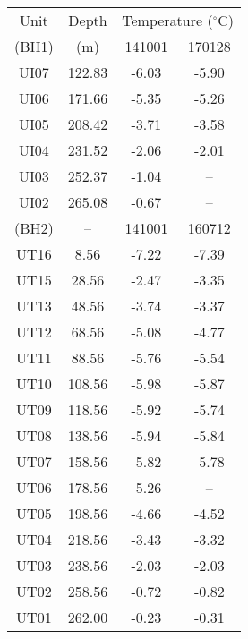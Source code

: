\documentclass[utf8]{article}
\begin{document}
\begin{table}
{\begin{minipage}{85mm}
        \begin{tabular}{cccc}
          \hline
          Unit &  Depth & \multicolumn{2}{c}{Temperature ($^\circ$C)}\\
          (BH1)&   (m)  & 141001 & 170128 \\
          \hline
          UI07 & 122.83 & -6.03 & -5.90 \\
          UI06 & 171.66 & -5.35 & -5.26 \\
          UI05 & 208.42 & -3.71 & -3.58 \\
          UI04 & 231.52 & -2.06 & -2.01 \\
          UI03 & 252.37 & -1.04 &   --  \\
          UI02 & 265.08 & -0.67 &   --  \\
          \hline
          (BH2)&   --   & 141001 & 160712 \\
          \hline
          UT16 &   8.56 & -7.22 & -7.39 \\
          UT15 &  28.56 & -2.47 & -3.35 \\
          UT13 &  48.56 & -3.74 & -3.37 \\
          UT12 &  68.56 & -5.08 & -4.77 \\
          UT11 &  88.56 & -5.76 & -5.54 \\
          UT10 & 108.56 & -5.98 & -5.87 \\
          UT09 & 118.56 & -5.92 & -5.74 \\
          UT08 & 138.56 & -5.94 & -5.84 \\
          UT07 & 158.56 & -5.82 & -5.78 \\
          UT06 & 178.56 & -5.26 &   --  \\
          UT05 & 198.56 & -4.66 & -4.52 \\
          UT04 & 218.56 & -3.43 & -3.32 \\
          UT03 & 238.56 & -2.03 & -2.03 \\
          UT02 & 258.56 & -0.72 & -0.82 \\
          UT01 & 262.00 & -0.23 & -0.31 \\
          \hline
        \end{tabular}
      \end{minipage}}
    \end{table}


\end{document}
